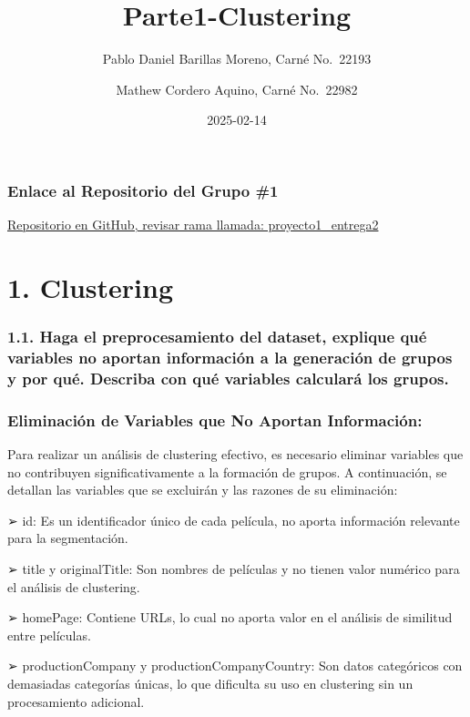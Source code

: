 \documentclass[
]{article}
\title{Parte1-Clustering}
\author{Pablo Daniel Barillas Moreno, Carné No.~22193 \and Mathew
Cordero Aquino, Carné No.~22982}
\date{2025-02-14}
\begin{document}
\maketitle

\subsubsection{Enlace al Repositorio del Grupo
\#1}\label{enlace-al-repositorio-del-grupo-1}

\href{https://github.com/DanielBarillas/Miner-a_de_datos_Proyecto1_Entrega1_Grupo1/tree/proyecto1_entrega2}{Repositorio
en GitHub, revisar rama llamada: proyecto1\_entrega2}

\section{1. Clustering}\label{clustering}

\subsubsection{1.1. Haga el preprocesamiento del dataset, explique qué
variables no aportan información a la generación de grupos y por qué.
Describa con qué variables calculará los
grupos.}\label{haga-el-preprocesamiento-del-dataset-explique-quuxe9-variables-no-aportan-informaciuxf3n-a-la-generaciuxf3n-de-grupos-y-por-quuxe9.-describa-con-quuxe9-variables-calcularuxe1-los-grupos.}

\subsubsection{Eliminación de Variables que No Aportan
Información:}\label{eliminaciuxf3n-de-variables-que-no-aportan-informaciuxf3n}

Para realizar un análisis de clustering efectivo, es necesario eliminar
variables que no contribuyen significativamente a la formación de
grupos. A continuación, se detallan las variables que se excluirán y las
razones de su eliminación:

➢ id: Es un identificador único de cada película, no aporta información
relevante para la segmentación.

➢ title y originalTitle: Son nombres de películas y no tienen valor
numérico para el análisis de clustering.

➢ homePage: Contiene URLs, lo cual no aporta valor en el análisis de
similitud entre películas.

➢ productionCompany y productionCompanyCountry: Son datos categóricos
con demasiadas categorías únicas, lo que dificulta su uso en clustering
sin un procesamiento adicional.
\end{document}

